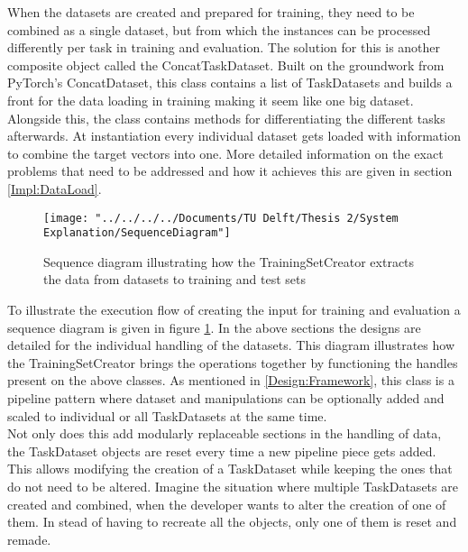 When the datasets are created and prepared for training, they need to be combined as a single dataset, but from which the instances can be processed differently per task in training and evaluation. The solution for this is another composite object called the ConcatTaskDataset. Built on the groundwork from PyTorch's ConcatDataset, this class contains a list of TaskDatasets and builds a front for the data loading in training making it seem like one big dataset. Alongside this, the class contains methods for differentiating the different tasks afterwards. At instantiation every individual dataset gets loaded with information to combine the target vectors into one. More detailed information on the exact problems that need to be addressed and how it achieves this are given in section \ref{Impl:DataLoad}. \\

\begin{figure}
	\centering
	\texttt{[image: "../../../../Documents/TU Delft/Thesis 2/System Explanation/SequenceDiagram"]}
	\caption{Sequence diagram illustrating how the TrainingSetCreator extracts the data from datasets to training and test sets}
	\label{fig:sequencediagram}
\end{figure}

To illustrate the execution flow of creating the input for training and evaluation a sequence diagram is given in figure \ref{fig:sequencediagram}. In the above sections the designs are detailed for the individual handling of the datasets. This diagram illustrates how the TrainingSetCreator brings the operations together by functioning the handles present on the above classes. As mentioned in \ref{Design:Framework}, this class is a pipeline pattern where dataset and manipulations can be optionally added and scaled to individual or all TaskDatasets at the same time.\\

Not only does this add modularly replaceable sections in the handling of data, the TaskDataset objects are reset every time a new pipeline piece gets added. This allows modifying the creation of a TaskDataset while keeping the ones that do not need to be altered. Imagine the situation where multiple TaskDatasets are created and combined, when the developer wants to alter the creation of one of them. In stead of having to recreate all the objects, only one of them is reset and remade. \\


